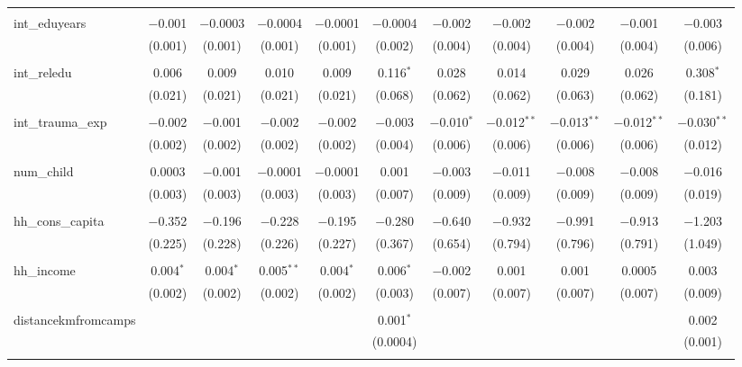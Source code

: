 \begin{table}[H]
\begin{tabular}{@{\extracolsep{4pt}}lcccccccccc}
  & & & & & & & & & & \\ 
 int\_eduyears & $-$0.001 & $-$0.0003 & $-$0.0004 & $-$0.0001 & $-$0.0004 & $-$0.002 & $-$0.002 & $-$0.002 & $-$0.001 & $-$0.003 \\ 
  & (0.001) & (0.001) & (0.001) & (0.001) & (0.002) & (0.004) & (0.004) & (0.004) & (0.004) & (0.006) \\ 
  & & & & & & & & & & \\ 
 int\_reledu & 0.006 & 0.009 & 0.010 & 0.009 & 0.116$^{*}$ & 0.028 & 0.014 & 0.029 & 0.026 & 0.308$^{*}$ \\ 
  & (0.021) & (0.021) & (0.021) & (0.021) & (0.068) & (0.062) & (0.062) & (0.063) & (0.062) & (0.181) \\ 
  & & & & & & & & & & \\ 
 int\_trauma\_exp & $-$0.002 & $-$0.001 & $-$0.002 & $-$0.002 & $-$0.003 & $-$0.010$^{*}$ & $-$0.012$^{**}$ & $-$0.013$^{**}$ & $-$0.012$^{**}$ & $-$0.030$^{**}$ \\ 
  & (0.002) & (0.002) & (0.002) & (0.002) & (0.004) & (0.006) & (0.006) & (0.006) & (0.006) & (0.012) \\ 
  & & & & & & & & & & \\ 
 num\_child & 0.0003 & $-$0.001 & $-$0.0001 & $-$0.0001 & 0.001 & $-$0.003 & $-$0.011 & $-$0.008 & $-$0.008 & $-$0.016 \\ 
  & (0.003) & (0.003) & (0.003) & (0.003) & (0.007) & (0.009) & (0.009) & (0.009) & (0.009) & (0.019) \\ 
  & & & & & & & & & & \\ 
 hh\_cons\_capita & $-$0.352 & $-$0.196 & $-$0.228 & $-$0.195 & $-$0.280 & $-$0.640 & $-$0.932 & $-$0.991 & $-$0.913 & $-$1.203 \\ 
  & (0.225) & (0.228) & (0.226) & (0.227) & (0.367) & (0.654) & (0.794) & (0.796) & (0.791) & (1.049) \\ 
  & & & & & & & & & & \\ 
 hh\_income & 0.004$^{*}$ & 0.004$^{*}$ & 0.005$^{**}$ & 0.004$^{*}$ & 0.006$^{*}$ & $-$0.002 & 0.001 & 0.001 & 0.0005 & 0.003 \\ 
  & (0.002) & (0.002) & (0.002) & (0.002) & (0.003) & (0.007) & (0.007) & (0.007) & (0.007) & (0.009) \\ 
  & & & & & & & & & & \\ 
 distancekmfromcamps &  &  &  &  & 0.001$^{*}$ &  &  &  &  & 0.002 \\ 
  &  &  &  &  & (0.0004) &  &  &  &  & (0.001) \\ 
  & & & & & & & & & & \\ 

\end{tabular}
\end{table}
